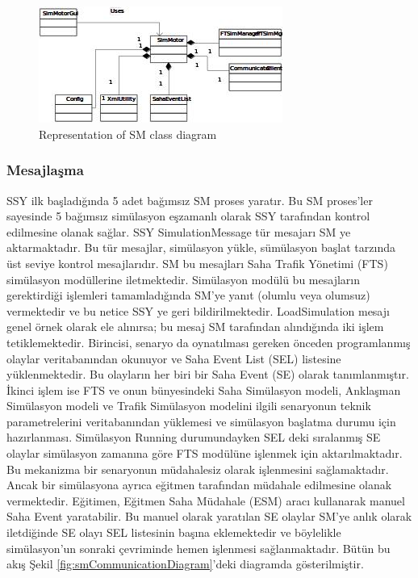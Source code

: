 \documentclass[conference]{IEEEtran}
\begin{document}
\begin{figure}[h!]
  \centering
  \includegraphics[width=8cm]{smgrafic.jpg}
  \caption{Representation of SM class diagram}\label{fig:smgrafic}
\end{figure}



\subsubsection{Mesajlaşma}
SSY ilk başladığında 5 adet bağımsız SM proses yaratır. Bu SM proses’ler sayesinde 5 bağımsız simülasyon eşzamanlı olarak SSY tarafından kontrol edilmesine olanak sağlar. SSY SimulationMessage tür mesajarı SM ye aktarmaktadır. Bu tür mesajlar, simülasyon yükle, sümülasyon başlat tarzında üst seviye kontrol mesajlarıdır. SM bu mesajları Saha Trafik Yönetimi (FTS) simülasyon modüllerine iletmektedir. Simülasyon modülü bu mesajların gerektirdiği işlemleri tamamladığında SM’ye yanıt (olumlu veya olumsuz) vermektedir ve bu netice SSY ye geri bildirilmektedir.
LoadSimulation mesajı genel örnek olarak ele alınırsa; bu mesaj SM tarafından alındığında iki işlem tetiklemektedir. Birincisi, senaryo da oynatılması gereken önceden programlanmış olaylar veritabanından okunuyor ve Saha Event List (SEL) listesine yüklenmektedir. Bu olayların her biri bir Saha Event (SE) olarak tanımlanmıştır. 
İkinci işlem ise FTS ve onun bünyesindeki Saha Simülasyon modeli, Anklaşman Simülasyon  modeli ve Trafik Simülasyon  modelini ilgili senaryonun teknik parametrelerini veritabanından yüklemesi ve simülasyon başlatma durumu için hazırlanması.
Simülasyon Running durumundayken SEL deki sıralanmış SE olaylar simülasyon zamanına göre FTS modülüne işlenmek için aktarılmaktadır. Bu mekanizma bir senaryonun müdahalesiz olarak işlenmesini sağlamaktadır. Ancak bir simülasyona ayrıca eğitmen tarafından müdahale edilmesine olanak vermektedir. Eğitimen, Eğitmen Saha Müdahale (ESM) aracı kullanarak manuel Saha Event yaratabilir. Bu manuel olarak yaratılan SE olaylar SM’ye anlık olarak iletdiğinde SE olayı SEL listesinin başına eklemektedir ve böylelikle simülasyon’un sonraki çevriminde hemen işlenmesi sağlanmaktadır. Bütün bu akış Şekil \ref{fig:smCommunicationDiagram}'deki diagramda gösterilmiştir.
\end{document}
